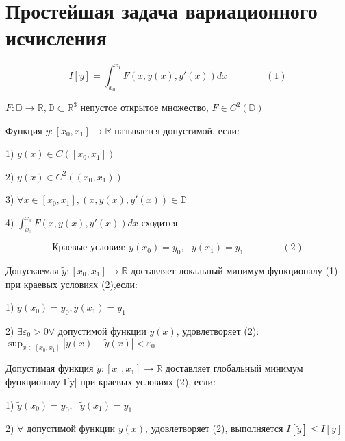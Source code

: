\documentclass[12pt, a4paper]{report}
\begin{document}
\section{Простейшая задача вариационного исчисления}

\[ I[y]= \int_{x_0}^{x_1} F ( x, y(x),y'(x))dx \quad \quad \quad \quad (1)  \] 

\( F : \mathbb{D} \to \mathbb{R}, \mathbb{D} \subset \mathbb{R} ^3   \) непустое открытое множество, \( F \in  C ^2 (\mathbb{D}) \) 

\begin{definition}   
    Функция \( y : [x_0,x_1]\to \mathbb{R}  \) называется допустимой, если: 
    
    1) \(\displaystyle  y(x)\in  C([x_0,x_1]) \)
    
    2) \(\displaystyle  y(x) \in  C ^2 ((x_0,x_1)) \)
    
    3) \( \displaystyle \forall x \in  [x_0,x_1 ] , ( x, y(x), y ' (x)) \in  \mathbb{D}  \)
    
    4) \( \displaystyle \int_{x_0 }^{x_1} F(x,y(x),y' (x))dx \)  сходится

\end{definition}



\[ \text{Краевые условия: } y(x_0)=y_0,\text{ }  y(x_1)=y_1 \quad \quad \quad \quad (2) \] 

\begin{definition}
    Допускаемая \( \tilde{y}:[x_0,x_1] \to  \mathbb{R}  \) доставляет локальный минимум функционалу (1) при краевых условиях (2),если: 

    1) \( \tilde{y}(x_0)=y_0, \tilde{y}(x_1)= y_1   \) 

    2) \( \exists \varepsilon_0 >0 \forall   \) допустимой функции \( y(x) \), удовлетворяет (2): \( \sup _{x \in  [x_0,x_1]}|y(x)-\tilde{y}(x) |< \varepsilon_0  \) 
\end{definition}

\begin{definition}
    Допустимая функция \( \tilde{y} : [x_0,x_1] \to  \mathbb{R} \)  доставляет глобальный минимум функционалу I[y] при краевых условиях (2), если: 

    1) \( \tilde{y} (x_0)=y_0, \text{ } \tilde{y} (x_1) =y_1 \)
    
    2) \( \forall \) допустимой функции \( y(x) \), удовлетворяет (2), выполняется \( I[\tilde{y} ] \le I [y] \) 
\end{definition}
\end{document}
